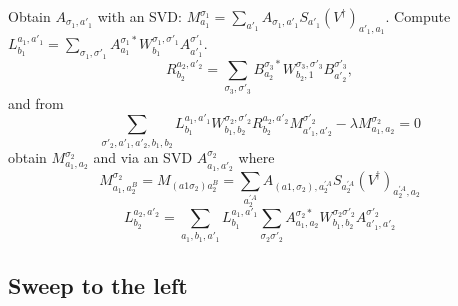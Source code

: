 \documentclass[showpacs,preprintnumbers,amsmath,amssymb,superscriptaddress,showkeys,pre]{revtex4}
\begin{document}
Obtain $A_{\sigma_1,a'_1}$ with an SVD: $M^{\sigma_1}_{a_1} = \sum_{a'_1} A_{\sigma_1,a'_1} S_{a'_1} (V^\dagger)_{a'_1,a_1}$.
Compute $L^{a_1,a'_1}_{b_1} = \sum_{\sigma_1,\sigma'_1} A^{\sigma_1 *}_{a_1} W^{\sigma_1,\sigma'_1}_{b_1} A^{\sigma'_1}_{a'_1}$.
\begin{equation}
R_{b_2}^{a_2,a'_2} =  \sum_{\sigma_3,\sigma'_3} B^{\sigma_3 *}_{a_2}
W^{\sigma_3,\sigma'_3}_{b_2,1} B^{\sigma'_3}_{a'_2},
\end{equation}
and from
\begin{equation}
\sum_{\sigma'_2,a'_1,a'_2,b_1,b_2} L^{a_1,a'_1}_{b_1} W^{\sigma_2,\sigma'_2}_{b_1,b_2} R_{b_2}^{a_2,a'_2} M^{\sigma'_2}_{a'_1,a'_2} - \lambda M^{\sigma_2}_{a_1,a_2}=0
\end{equation}
obtain $M^{\sigma_2}_{a_1,a_2}$ and via an SVD $A^{\sigma_2}_{a_1,a'_2}$ where
 \begin{equation}
M^{\sigma_2}_{a_1,a^B_2}=M_{(a1\sigma_2)a^B_2}=\sum_{a^{'A}_2} A_{(a1,\sigma_2),a^{'A}_2} S_{a^{'A}_2}(V^\dagger)_{a^{'A}_2,a_2}
\end{equation}
\begin{equation}
L^{a_2,a'_2}_{b_2} = \sum_{a_1,b_1,a'_1} L^{a_1,a'_1}_{b_1} \sum_{\sigma_2\sigma'_2} A^{\sigma_2 *}_{a_1,a_2} W^{\sigma_2\sigma'_2}_{b_1,b_2}A^{\sigma'_2}_{a'_1,a'_2}
\end{equation}

\subsection{Sweep to the left}
\end{document}
